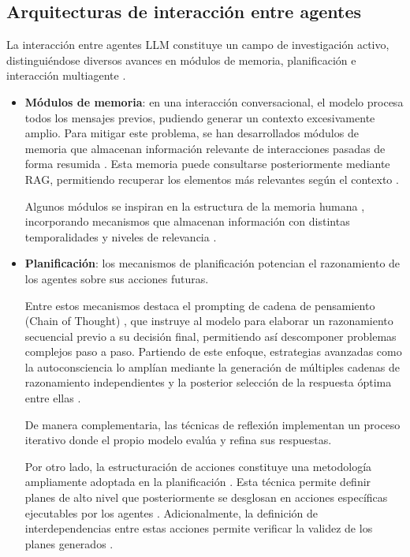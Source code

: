 \subsection{Arquitecturas de interacción entre agentes}
La interacción entre agentes LLM constituye un campo de investigación activo, distinguiéndose diversos avances en módulos de memoria, planificación e interacción multiagente \cite{wang_survey_2024}.
\begin{itemize}
  \label{sec:modulos_memoria}
  \item{\textbf{Módulos de memoria}}: en una interacción conversacional, el modelo procesa todos los mensajes previos, pudiendo generar un contexto excesivamente amplio. Para mitigar este problema, se han desarrollados módulos de memoria que almacenan información relevante de interacciones pasadas de forma resumida \cite{zhang_building_2024-1, fischer_reflective_2023, liang_unleashing_2023}. Esta memoria puede consultarse posteriormente mediante RAG, permitiendo recuperar los elementos más relevantes según el contexto \cite{zhao_expel_2024}.

Algunos módulos se inspiran en la estructura de la memoria humana \cite{zhong_memorybank_2024}, incorporando mecanismos que almacenan información con distintas temporalidades y niveles de relevancia \cite{wang_survey_2024, park_generative_2023}.


\item{\textbf{Planificación}}\label{plani}: los mecanismos de planificación potencian el razonamiento de los agentes sobre sus acciones futuras.

  Entre estos mecanismos destaca el prompting de cadena de pensamiento (Chain of Thought) \cite{wei_chain--thought_2023}, que instruye al modelo para elaborar un razonamiento secuencial previo a su decisión final, permitiendo así descomponer problemas complejos paso a paso.
Partiendo de este enfoque, estrategias avanzadas como la autoconsciencia \cite{liang_unleashing_2023} lo amplían mediante la generación de múltiples cadenas de razonamiento independientes y la posterior selección de la respuesta óptima entre ellas \cite{yao_tree_nodate, wang_recmind_2024}.

De manera complementaria, las técnicas de reflexión \cite{shinn_reflexion_nodate, madaan_self-refine_nodate, miao_selfcheck_2023} implementan un proceso iterativo donde el propio modelo evalúa y refina sus respuestas.

Por otro lado, la estructuración de acciones constituye una metodología ampliamente adoptada en la planificación \cite{lin_swiftsage_nodate, huang_language_nodate, wang_describe_2024}. Esta técnica permite definir planes de alto nivel que posteriormente se desglosan en acciones específicas ejecutables por los agentes \cite{zhu_ghost_2023, song_llm-planner_2023, wang_voyager_2023, liu_odyssey_2024}. Adicionalmente, la definición de interdependencias entre estas acciones permite verificar la validez de los planes generados \cite{raman_planning_nodate, liu_llmp_2023, dagan_dynamic_2023}.


\end{itemize}
